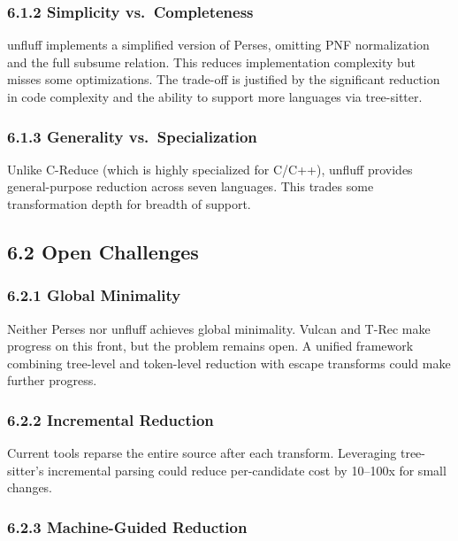 \documentclass[
  letterpaper,
]{article}
\begin{document}
\subsubsection{6.1.2 Simplicity
vs.~Completeness}\label{simplicity-vs.-completeness}

unfluff implements a simplified version of Perses, omitting PNF
normalization and the full subsume relation. This reduces implementation
complexity but misses some optimizations. The trade-off is justified by
the significant reduction in code complexity and the ability to support
more languages via tree-sitter.

\subsubsection{6.1.3 Generality
vs.~Specialization}\label{generality-vs.-specialization}

Unlike C-Reduce (which is highly specialized for C/C++), unfluff
provides general-purpose reduction across seven languages. This trades
some transformation depth for breadth of support.

\subsection{6.2 Open Challenges}\label{open-challenges}

\subsubsection{6.2.1 Global Minimality}\label{global-minimality}

Neither Perses nor unfluff achieves global minimality. Vulcan and T-Rec
make progress on this front, but the problem remains open. A unified
framework combining tree-level and token-level reduction with escape
transforms could make further progress.

\subsubsection{6.2.2 Incremental Reduction}\label{incremental-reduction}

Current tools reparse the entire source after each transform. Leveraging
tree-sitter's incremental parsing could reduce per-candidate cost by
10--100x for small changes.

\subsubsection{6.2.3 Machine-Guided
Reduction}\label{machine-guided-reduction}
\end{document}
